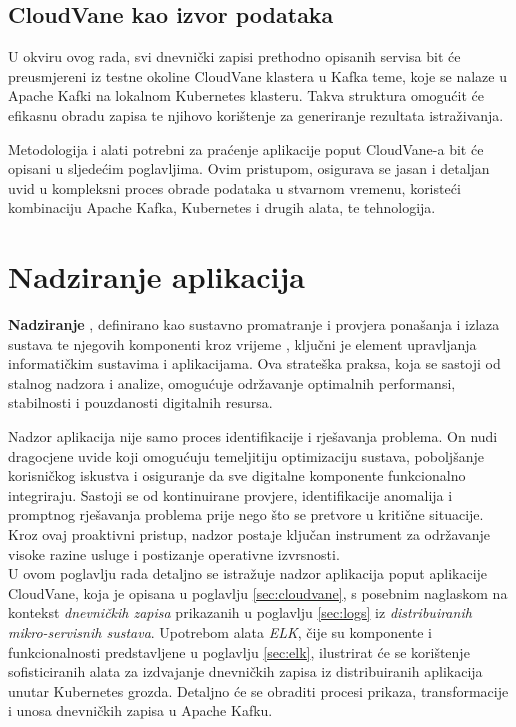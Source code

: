 \documentclass[times, utf8, diplomski]{fer}
\begin{document}
\section{CloudVane kao izvor podataka}

U okviru ovog rada, svi dnevnički zapisi prethodno opisanih servisa bit će preusmjereni iz testne okoline CloudVane klastera u Kafka teme, koje se nalaze u Apache Kafki na lokalnom Kubernetes klasteru. Takva struktura omogućit će efikasnu obradu zapisa te njihovo korištenje za generiranje rezultata istraživanja.

Metodologija i alati potrebni za praćenje aplikacije poput CloudVane-a bit će opisani u sljedećim poglavljima. Ovim pristupom, osigurava se jasan i detaljan uvid u kompleksni proces obrade podataka u stvarnom vremenu, koristeći kombinaciju Apache Kafka, Kubernetes i drugih alata, te tehnologija.

\chapter{Nadziranje aplikacija}
\label{sec:monitoring}

\textbf{Nadziranje} , definirano kao sustavno promatranje i provjera ponašanja i izlaza sustava te njegovih komponenti kroz vrijeme \citep{monitorama_monitorama_2016}, ključni je element upravljanja informatičkim sustavima i aplikacijama. Ova strateška praksa, koja se sastoji od stalnog nadzora i analize, omogućuje održavanje optimalnih performansi, stabilnosti i pouzdanosti digitalnih resursa.

Nadzor aplikacija nije samo proces identifikacije i rješavanja problema. On nudi dragocjene uvide koji omogućuju temeljitiju optimizaciju sustava, poboljšanje korisničkog iskustva i osiguranje da sve digitalne komponente funkcionalno integriraju. Sastoji se od kontinuirane provjere, identifikacije anomalija i promptnog rješavanja problema prije nego što se pretvore u kritične situacije. Kroz ovaj proaktivni pristup, nadzor postaje ključan instrument za održavanje visoke razine usluge i postizanje operativne izvrsnosti.\\

U ovom poglavlju rada detaljno se istražuje nadzor aplikacija poput aplikacije CloudVane, koja je opisana u poglavlju \ref{sec:cloudvane}, s posebnim naglaskom na kontekst \emph{dnevničkih zapisa} prikazanih u poglavlju \ref{sec:logs} iz \emph{distribuiranih mikro-servisnih sustava}. Upotrebom alata \emph{ELK}, čije su komponente i funkcionalnosti predstavljene u poglavlju \ref{sec:elk}, ilustrirat će se korištenje sofisticiranih alata za izdvajanje dnevničkih zapisa iz distribuiranih aplikacija unutar Kubernetes grozda. Detaljno će se obraditi procesi prikaza, transformacije i unosa dnevničkih zapisa u Apache Kafku.
\end{document}
